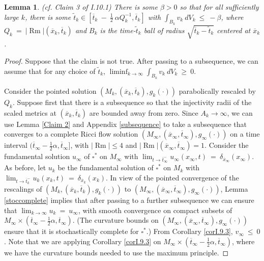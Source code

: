 \documentclass[12pt]{amsart}
\newcommand{\Rm}{\operatorname{Rm}}
\numberwithin{equation}{section}
\theoremstyle{plain}
\newtheorem{lemma}[equation]{Lemma}
\theoremstyle{definition}
\theoremstyle{remark}
\begin{document}
\begin{lemma} (cf. Claim 3 of I.10.1) \label{Claim 3}
There is some $\beta > 0$ so that for 
all sufficiently large $k$,
there is some
$\widetilde{t}_k \in [\overline{t}_k \: - \: \frac12 \: \alpha Q_k^{-1}, \overline{t}_k]$ with
$\int_{B_k} v_k \: dV_k \: \le \: - \beta$, where $Q_k \: = \: |\Rm|(\overline{x}_k,
\overline{t}_k)$ and $B_k$ is the time-$\widetilde{t}_k$ ball of radius
$\sqrt{\overline{t}_k - \widetilde{t}_k}$ centered at $\overline{x}_k$.
\end{lemma}
\begin{proof} 
Suppose that the claim is not true.  After passing to a subsequence, we
can assume that for any choice of $\widetilde{t}_k$, 
$\liminf_{k \rightarrow \infty}
\int_{B_k} v_k \: dV_k \: \ge \: 0$.


Consider the pointed solution $(M_k, (\overline{x}_k, \overline{t}_k), g_k(\cdot))$ 
parabolically rescaled by $Q_k$. 
Suppose first that there is a subsequence so that
the injectivity radii of the scaled metrics at
$(\overline{x}_k, \overline{t}_k)$ are bounded away from zero.
Since $A_k \rightarrow \infty$, we can use 
Lemma \ref{Claim 2} and
Appendix \ref{subsequence} to 
take a subsequence that converges to a complete Ricci flow solution 
$(M_\infty, (\overline{x}_\infty, \overline{t}_\infty), g_\infty(\cdot))$ on a
time interval $(\overline{t}_\infty - \frac12 \alpha, \overline{t}_\infty]$, with
$|\Rm| \le 4$ and $|\Rm|(\overline{x}_\infty, \overline{t}_\infty) = 1$.
Consider the fundamental solution $u_\infty$ of $\square^*$ on $M_\infty$
with $\lim_{t \rightarrow \overline{t}_\infty^-} u_\infty(x_\infty, t) \: = \:
\delta_{\overline{x}_\infty}(x_\infty)$.
As before,
let $u_k$ be the fundamental solution 
of $\square^*$ on $M_k$
with $\lim_{t \rightarrow \overline{t}_k^-} u_k(x_k, t) \: = \:
\delta_{\overline{x}_k}(x_k)$.
In view of the pointed convergence of the rescalings of 
$(M_k, (\overline{x}_k, \overline{t}_k), g_k(\cdot))$ to
$(M_\infty, (\overline{x}_\infty, \overline{t}_\infty), 
g_\infty(\cdot))$,
Lemma \ref{stoccomplete} implies that
after passing to a further subsequence we can ensure that
$\lim_{k \rightarrow \infty} u_k \: = \: u_\infty$, with 
smooth convergence on
compact subsets of $M_\infty \times (\overline{t}_\infty
 - \frac12 \alpha, \overline{t}_\infty)$.
(The curvature bounds on 
$(M_\infty, (\overline{x}_\infty, \overline{t}_\infty), 
g_\infty(\cdot))$ ensure that it is stochastically complete
for $\square^*$.)
From Corollary \ref{corI.9.3}, $v_\infty \: \le \: 0$.
Note that we are applying Corollary \ref{corI.9.3} on
$M_\infty \times (\overline{t}_\infty 
- \frac12 \alpha, \overline{t}_\infty)$,
where we have the curvature bounds needed to use the maximum
principle.
 


\end{proof}
\end{document}
